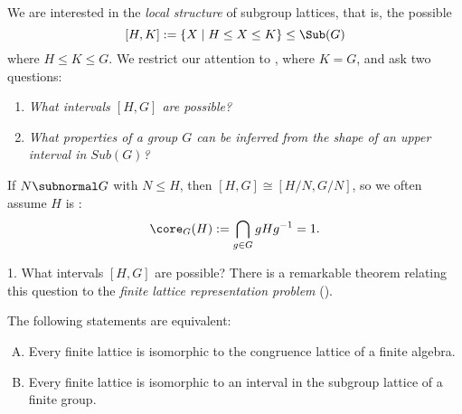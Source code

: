 \begin{frame}[fragile,label=LocalStructure]{}
We are interested in the \emph{local structure} of subgroup lattices, that is,
the possible 
\[
[H, K] := \{X \mid H \leq X \leq K\} \leq \Sub(G)
\]
where $H \leq K \leq G$. 
\vskip4mm
We restrict our attention to , where $K = G$, and ask two
questions:
\vskip4mm
\begin{enumerate}
\item \emph{What intervals $[H,G]$ are possible?}
\vskip4mm
\item \emph{What properties of a group $G$ can be inferred from the shape of an
  upper interval in $Sub(G)$?}
\end{enumerate}
\end{frame}

\begin{frame}[fragile,label=LocalStructureCoreFree]{}
If $N \subnormal G$
with $N \leq H$, then  $[H, G]\cong [H/N, G/N]$, 
\vskip2mm
so we often assume $H$ is :
\[
\core_G(H) := \bigcap_{g\in G} gHg^{-1} = 1.
\]
\end{frame}

\begin{frame}[fragile,label=LocalStructureNote]{}
\end{frame}

\begin{frame}[fragile,label=LocalStructure]{1. What intervals $[H,G]$ are possible?}
There is a remarkable theorem relating this question to the \emph{finite lattice representation problem} (\FLRP).
\vskip5mm
\begin{theorem}
\label{thm:P5}
The following statements are equivalent:
\begin{enumerate}[(A)]
\item Every finite lattice is isomorphic to
  the congruence lattice of a finite algebra.
\item Every finite lattice is isomorphic to
  an interval in the subgroup lattice of a finite group.
\end{enumerate}
\end{theorem}
\end{frame}

